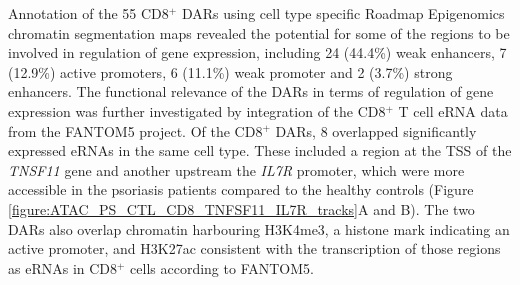 Annotation of the 55 CD8$^+$ DARs using cell type specific Roadmap Epigenomics chromatin segmentation maps revealed the potential for some of the regions to be involved in regulation of gene expression, including 24 (44.4\%) weak enhancers, 7 (12.9\%) active promoters, 6 (11.1\%) weak promoter and 2 (3.7\%) strong enhancers. The functional relevance of the DARs in terms of regulation of gene expression was further investigated by integration of the CD8$^+$ T cell eRNA data from the FANTOM5 project. Of the CD8$^+$ DARs, 8 overlapped significantly expressed eRNAs in the same cell type. These included a region at the TSS of the \textit{TNSF11} gene and another upstream the \textit{IL7R} promoter, which were more accessible in the psoriasis patients compared to the healthy controls (Figure \ref{figure:ATAC_PS_CTL_CD8_TNFSF11_IL7R_tracks}A and B). The two DARs also overlap chromatin harbouring H3K4me3, a histone mark indicating an active promoter, and H3K27ac consistent with the transcription of those regions as eRNAs in CD8$^+$ cells according to FANTOM5.

